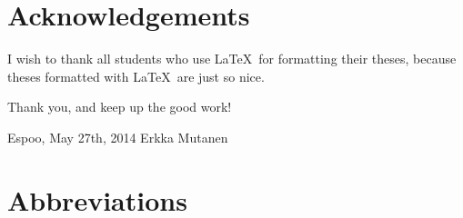 \documentclass[12pt,a4paper,oneside,pdftex]{report}
\newcommand{\DATE}{May 27th, 2014}
\newcommand{\AUTHOR}{Erkka Mutanen}
\begin{document}


\chapter*{Acknowledgements}

I wish to thank all students who use \LaTeX\ for formatting their theses,
because theses formatted with \LaTeX\ are just so nice.

Thank you, and keep up the good work!
\vskip 10mm

\noindent Espoo, \DATE
\vskip 5mm
\noindent\AUTHOR

\cleardoublepage
\tableofcontents

\cleardoublepage
% 

\chapter*{Abbreviations}

\end{document}
